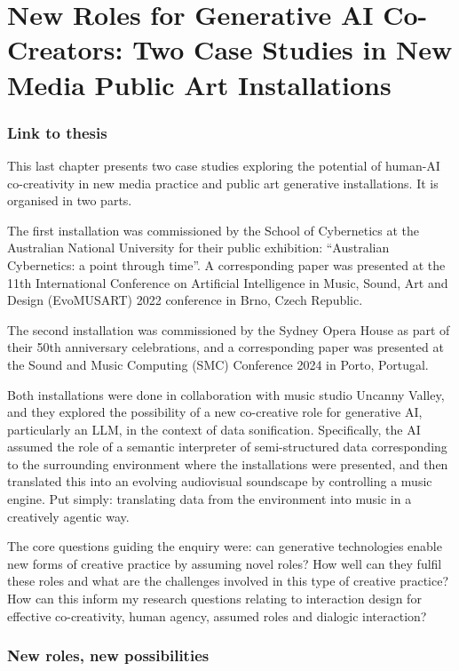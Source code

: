 \chapter{New Roles for Generative AI Co-Creators: Two Case Studies in New Media Public Art Installations}

\subsection{Link to thesis}
This last chapter presents two case studies exploring the potential of human-AI co-creativity in new media practice and public art generative installations. It is organised in two parts.

The first installation was commissioned by the School of Cybernetics at the Australian National University for their public exhibition: “Australian Cybernetics: a point through time”. A corresponding paper was presented at the 11th International Conference on Artificial Intelligence in Music, Sound, Art and Design (EvoMUSART) 2022 conference in Brno, Czech Republic.

The second installation was commissioned by the Sydney Opera House as part of their 50th anniversary celebrations, and a corresponding paper was presented at the Sound and Music Computing (SMC) Conference 2024 in Porto, Portugal.

Both installations were done in collaboration with music studio Uncanny Valley, and they explored the possibility of a new co-creative role for generative AI, particularly an LLM, in the context of data sonification. Specifically, the AI assumed the role of a semantic interpreter of semi-structured data corresponding to the surrounding environment where the installations were presented, and then translated this into an evolving audiovisual soundscape by controlling a music engine. Put simply: translating data from the environment into music in a creatively agentic way.

The core questions guiding the enquiry were: can generative technologies enable new forms of creative practice by assuming novel roles? How well can they fulfil these roles and what are the challenges involved in this type of creative practice? How can this inform my research questions relating to interaction design for effective co-creativity, human agency, assumed roles and dialogic interaction?

\subsection{New roles, new possibilities}

